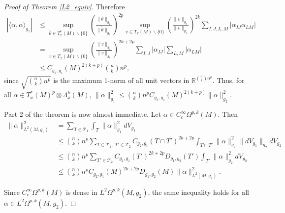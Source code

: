 \documentclass[11pt]{article}
\newcommand{\iprod}[1]{\langle #1 \rangle}
\begin{document}
\begin{proof}[Proof of Theorem \ref{L2_equiv}]
Therefore
\begin{align*}
|\iprod{\alpha,\alpha}_{g_1}| &\le \sup_{\tilde \theta \in T_x^*(M) \backslash \{0\}} \left(\frac{\|\tilde \theta\|_{g_1}}{\|\tilde \theta\|_{g_2}}\right)^{2p}\sup_{v \in T_x(M)\backslash \{0\}}\left(\frac{\|v\|_{g_2}}{\|v\|_{g_1}}\right)^{2k}\sum_{I,J,L,M} |\alpha_{IJ}\alpha_{LM}| \\
&= \sup_{v \in T_x(M) \backslash \{0\}} \left(\frac{\|v\|_{g_2}}{\|v\|_{g_1}}\right)^{2k + 2p} \sum_{I,J}|\alpha_{IJ}|\sum_{L,M}|\alpha_{LM}| \\
&\le C_{g_2,g_1}(M)^{2(k + p)} {n \choose k}n^p,
\end{align*}
since $\sqrt{{n \choose k}n^p}$ is the maximum 1-norm of all unit vectors in $\mathbb{R}^{{n\choose k}n^p}$. Thus, for all $\alpha \in T^*_x(M)^p \otimes\Lambda^k_x(M)$, $\|\alpha\|_{g_1}^2 \le {n \choose k}n^pC_{g_2,g_1}(M)^{2(k + p)}\|\alpha\|_{g_2}^2$.

Part 2 of the theorem is now almost immediate. Let $\alpha \in C^\infty_c\Omega^{p,k}(M)$. Then 
\begin{align*}\|\alpha\|_{L^2(M,g_1)}^2 &= \sum_{T \in \mathcal{T}_1} \int_T \|\alpha\|_{g_1}^2dV_{g_1} \\
&\le {n \choose k}n^p\sum_{T \in \mathcal{T}_1, \; T' \in \mathcal{T}_2}C_{g_2,g_1}(T \cap T')^{2k + 2p} \int_{T \cap T'} \|\alpha\|_{g_2}^2\|dV_{g_1}\|_{g_2}dV_{g_2} \\
&\le{n \choose k}n^p\sum_{T' \in \mathcal{T}_2}C_{g_2,g_1}(T')^{2k + 2p}D_{g_1,g_2}(T')\int_{T'}\|\alpha\|_{g_2}^2dV_{g_2}\\
&\le{n \choose k}n^pC_{g_2,g_1}(M)^{2k + 2p}D_{g_1,g_2}(M)\|\alpha\|_{L^2(M,g_2)}^2.
\end{align*}

Since $C^\infty_c\Omega^{p,k}(M)$ is dense in $L^2\Omega^{p,k}(M,g_2)$, the same inequality holds for all $\alpha \in L^2\Omega^{p,k}(M,g_2)$. 
\end{proof}
\end{document}
